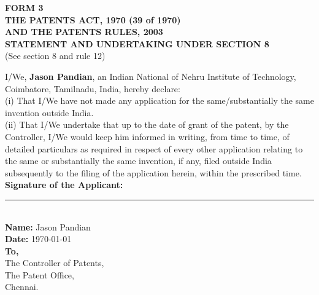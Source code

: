 \documentclass[12pt,a4paper]{article}
\begin{document}
\begin{center}
    \textbf{\large FORM 3} \\
    \vspace{0.3cm}
    \textbf{THE PATENTS ACT, 1970 (39 of 1970)} \\
    \textbf{AND THE PATENTS RULES, 2003} \\
    \vspace{0.5cm}
    \textbf{\large STATEMENT AND UNDERTAKING UNDER SECTION 8} \\
    (See section 8 and rule 12)
\end{center}
\vspace{1cm}

\noindent I/We, \textbf{Jason Pandian}, an Indian National of Nehru Institute of Technology, Coimbatore, Tamilnadu, India, hereby declare: \\

\noindent (i) That I/We have not made any application for the same/substantially the same invention outside India. \\

\noindent (ii) That I/We undertake that up to the date of grant of the patent, by the Controller, I/We would keep him informed in writing, from time to time, of detailed particulars as required in respect of every other application relating to the same or substantially the same invention, if any, filed outside India subsequently to the filing of the application herein, within the prescribed time. \\

\vspace{2cm}
\noindent \textbf{Signature of the Applicant:} \rule{4cm}{0.4pt} \\
\textbf{Name:} Jason Pandian \\
\textbf{Date:} \today \\

\vspace{2cm}
\noindent \textbf{To,} \\
The Controller of Patents, \\
The Patent Office, \\
Chennai.
\end{document}
